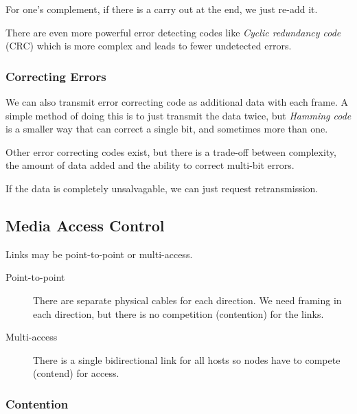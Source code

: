 \begin{note}
    For one's complement, if there is a carry out at the end, we just re-add it.
\end{note}

\begin{note}
    There are even more powerful error detecting codes like \emph{Cyclic redundancy code} (CRC) which is more complex and leads to fewer undetected errors.
\end{note}

\subsubsection{Correcting Errors}\label{ssub:correcting_errors}

We can also transmit error correcting code as additional data with each frame.
A simple method of doing this is to just transmit the data twice, but \emph{Hamming code} is a smaller way that can correct a single bit, and sometimes more than one.

Other error correcting codes exist, but there is a trade-off between complexity, the amount of data added and the ability to correct multi-bit errors.

\begin{note}
    If the data is completely unsalvagable, we can just request retransmission.
\end{note}

\subsection{Media Access Control}\label{sub:media_access_control}

Links may be point-to-point or multi-access.
\begin{description}
    \item[Point-to-point] There are separate physical cables for each direction.
        We need framing in each direction, but there is no competition (contention) for the links.
    \item[Multi-access] There is a single bidirectional link for all hosts so nodes have to compete (contend) for access.
\end{description}

\subsubsection{Contention}\label{ssub:contention}

